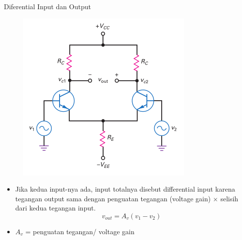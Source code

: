\documentclass[aspectratio=169]{beamer}
\begin{document}
\begin{frame}{Diferential Input dan Output}
	\begin{multicols}{2}
		\begin{figure}
			\centering
			\includegraphics[height=0.7\textheight]{gambar/01.differential_input_output}
		\end{figure}
		\columnbreak
		\begin{itemize}
			\item Jika kedua input-nya ada, input totalnya disebut differential input karena tegangan output sama dengan penguatan tegangan (voltage gain) $ \times $ selisih dari kedua tegangan input.
			\begin{equation} \label{pers.2}
				v_{out} = A_v (v_1 - v_2)
			\end{equation}
			\item $ A_v $ = penguatan tegangan/ voltage gain
		\end{itemize}
	\end{multicols}
\end{frame}
\end{document}

